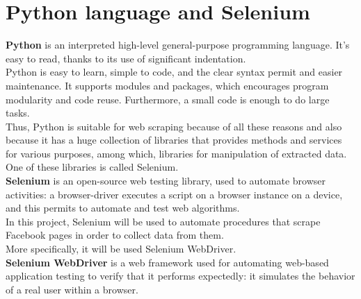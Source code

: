 \section{Python language and Selenium}
\textbf{Python} is an interpreted high-level general-purpose programming language. It's easy to read, thanks to its use of significant indentation. \\
Python is easy to learn, simple to code, and the clear syntax permit and easier maintenance. It supports modules and packages, which encourages program modularity and code reuse. Furthermore, a small code is enough to do large tasks.\\
Thus, Python is suitable for web scraping because of all these reasons and also because it has a huge collection of libraries that provides methods and services for various purposes, among which, libraries for manipulation of extracted data.\\
One of these libraries is called Selenium.
\\\textbf{Selenium} is an open-source web testing library, used to automate browser activities: a browser-driver executes a script on a browser instance on a device, and this permits to automate and test web algorithms.
\\In this project, Selenium will be used to automate procedures that scrape Facebook pages in order to collect data from them.\\
More specifically, it will be used Selenium WebDriver.
\\\textbf{Selenium WebDriver} is a web framework used for automating web-based application testing to verify that it performs expectedly: it simulates the behavior of a real user within a browser.	

